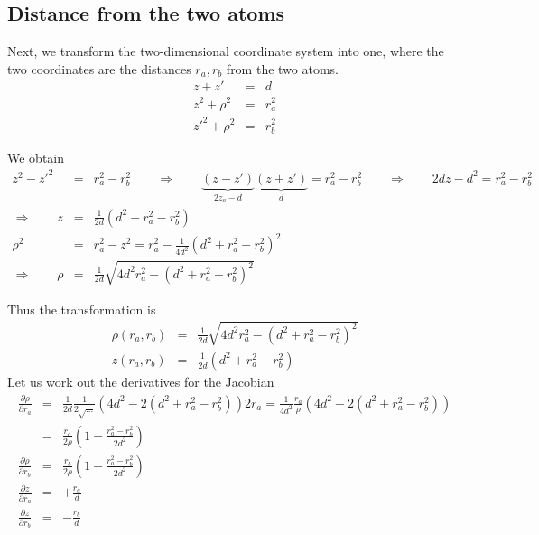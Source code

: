 \documentclass[11pt,a4paper]{report}
\begin{document}
\subsection{Distance from the two atoms}
Next, we transform the two-dimensional coordinate system into one, where
the two coordinates are the distances $r_a,r_b$ from the two atoms.
\begin{eqnarray*}
z+z'&=&d
\\
z^2+\rho^2&=&r_a^2
\\
z'^2+\rho^2&=&r_b^2
\end{eqnarray*}

We obtain 
\begin{eqnarray*}
z^2-z'^2&=&r_a^2-r_b^2
\qquad\Rightarrow\qquad
\underbrace{(z-z')}_{2z_a-d}\underbrace{(z+z')}_{d}=r_a^2-r_b^2
\qquad\Rightarrow\qquad
2dz-d^2=r_a^2-r_b^2
\\
\Rightarrow\qquad
z&=&\frac{1}{2d}(d^2+r_a^2-r_b^2)
\\
\rho^2&=&r_a^2-z^2=r_a^2-\frac{1}{4d^2}\left(d^2+r_a^2-r_b^2\right)^2
\\
\Rightarrow\qquad
\rho&=&
\frac{1}{2d}\sqrt{4d^2r_a^2-\left(d^2+r_a^2-r_b^2\right)^2}
\end{eqnarray*}

Thus the transformation is
\begin{eqnarray*}
\rho(r_a,r_b)&=&\frac{1}{2d}\sqrt{4d^2r_a^2-\left(d^2+r_a^2-r_b^2\right)^2}
\\
z(r_a,r_b)&=&\frac{1}{2d}(d^2+r_a^2-r_b^2)
\end{eqnarray*}
Let us work out the derivatives for the Jacobian
\begin{eqnarray*}
\frac{\partial\rho}{\partial r_a}&=&
\frac{1}{2d}\frac{1}{2\sqrt{\ldots}}
\left(4d^2-2(d^2+r_a^2-r_b^2)\right)2r_a
=
\frac{1}{4d^2}\frac{r_a}{\rho}\left(4d^2-2(d^2+r_a^2-r_b^2)\right)
\\
&=&
\frac{r_a}{2\rho}\left(1-\frac{r_a^2-r_b^2}{2d^2}\right)
\\
\frac{\partial\rho}{\partial r_b}&=&
\frac{r_b}{2\rho}\left(1+\frac{r_a^2-r_b^2}{2d^2}\right)
\\
\frac{\partial z}{\partial r_a}&=&+\frac{r_a}{d}
\\
\frac{\partial z}{\partial r_b}&=&-\frac{r_b}{d}
\end{eqnarray*}
\end{document}
